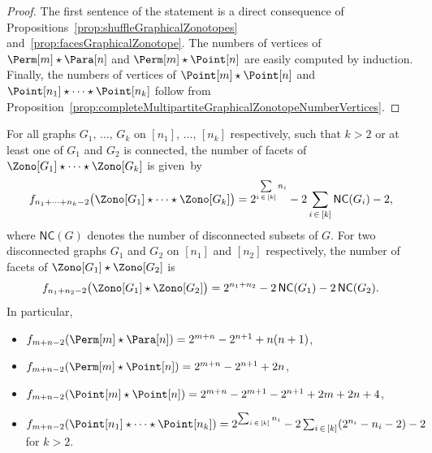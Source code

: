 \documentclass[AHL,Unicode,longabstracts,published]{cedram}
\newcommand{\shuffleDP}{\star} %
\newcommand{\nc}[1]{\mathsf{NC}(#1)}
\begin{document}
\begin{proof}
The first sentence of the statement is a direct consequence of Propo\-sitions~\ref{prop:shuffleGraphicalZonotopes} and~\ref{prop:facesGraphicalZonotope}. The numbers of vertices of $\Perm[m] \shuffleDP \Para[n]$ and \linebreak $\Perm[m] \shuffleDP \Point[n]$ are easily computed by induction. Finally, the numbers of vertices of $\Point[m] \shuffleDP \Point[n]$ and $\Point[n_1] \shuffleDP \cdots \shuffleDP \Point[n_k]$ follow from Proposition~\ref{prop:completeMultipartiteGraphicalZonotopeNumberVertices}.
\end{proof}

\break
\begin{prop}\label{prop:numberFacetsShuffleGraphicalZonotopes}
For all graphs $G_1,\, \dots,\, G_k$ on $[n_1],\, \dots,\, [n_k]$ respectively, such that $k > 2$ or at least one of $G_1$ and $G_2$ is connected, the number of facets of $\Zono[G_1] \shuffleDP \cdots \shuffleDP \Zono[G_k]$ is given~by
\[
f_{n_1 + \dots + n_k - 2} \big(\Zono[G_1] \shuffleDP \cdots \shuffleDP \Zono[G_k] \big) = 2^{\sum\limits_{i \,\in\,[k]} n_i} - 2 \sum_{i\,\in\,[k]} \nc{G_i} - 2,
\]
where $\nc{G}$ denotes the number of disconnected subsets of $G$. For two disconnected graphs $G_1$ and $G_2$ on $[n_1]$ and $[n_2]$ respectively, the number of facets of \linebreak $\Zono[G_1] \shuffleDP \Zono[G_2]$ is
\[
{f_{n_1+n_2-2} \big(\Zono[G_1] \shuffleDP \Zono[G_2] \big) = 2^{n_1 + n_2} - 2 \, \nc{G_1} - 2 \, \nc{G_2}}.
\]
In particular,
\begin{itemize}
\item $f_{m+n-2} (\Perm[m] \shuffleDP \Para[n] ) = 2^{m+n} - 2^{n+1} + n(n+1)$,
\item $f_{m+n-2} (\Perm[m] \shuffleDP \Point[n] ) = 2^{m+n} - 2^{n+1} + 2n$,
\item $f_{m+n-2} (\Point[m] \shuffleDP \Point[n]) = 2^{m+n} - 2^{m+1} - 2^{n+1} + 2m + 2n + 4$,
\item $f_{m+n-2} (\Point[n_1] \shuffleDP \cdots \shuffleDP \Point[n_k]) = 2^{\sum_{i\,\in\,[k]} n_i} - 2 \sum_{i\,\in\,[k]} (2^{n_i} - n_i -2) - 2$ for $k > 2$.
\end{itemize}
\end{prop}
\end{document}
